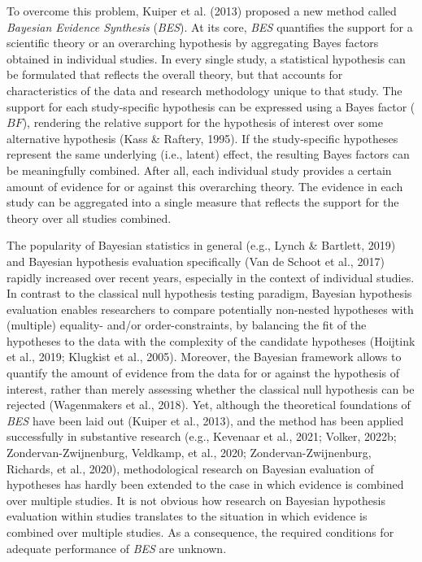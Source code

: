 \documentclass[
]{interact}
\begin{document}
To overcome this problem, Kuiper et al. (2013) proposed a new method
called \emph{Bayesian Evidence Synthesis} (\emph{BES}). At its core,
\emph{BES} quantifies the support for a scientific theory or an
overarching hypothesis by aggregating Bayes factors obtained in
individual studies. In every single study, a statistical hypothesis can
be formulated that reflects the overall theory, but that accounts for
characteristics of the data and research methodology unique to that
study. The support for each study-specific hypothesis can be expressed
using a Bayes factor (\(BF\)), rendering the relative support for the
hypothesis of interest over some alternative hypothesis (Kass \&
Raftery, 1995). If the study-specific hypotheses represent the same
underlying (i.e., latent) effect, the resulting Bayes factors can be
meaningfully combined. After all, each individual study provides a
certain amount of evidence for or against this overarching theory. The
evidence in each study can be aggregated into a single measure that
reflects the support for the theory over all studies combined.

The popularity of Bayesian statistics in general (e.g., Lynch \&
Bartlett, 2019) and Bayesian hypothesis evaluation specifically (Van de
Schoot et al., 2017) rapidly increased over recent years, especially in
the context of individual studies. In contrast to the classical null
hypothesis testing paradigm, Bayesian hypothesis evaluation enables
researchers to compare potentially non-nested hypotheses with (multiple)
equality- and/or order-constraints, by balancing the fit of the
hypotheses to the data with the complexity of the candidate hypotheses
(Hoijtink et al., 2019; Klugkist et al., 2005). Moreover, the Bayesian
framework allows to quantify the amount of evidence from the data for or
against the hypothesis of interest, rather than merely assessing whether
the classical null hypothesis can be rejected (Wagenmakers et al.,
2018). Yet, although the theoretical foundations of \emph{BES} have been
laid out (Kuiper et al., 2013), and the method has been applied
successfully in substantive research (e.g., Kevenaar et al., 2021;
Volker, 2022b; Zondervan-Zwijnenburg, Veldkamp, et al., 2020;
Zondervan-Zwijnenburg, Richards, et al., 2020), methodological research
on Bayesian evaluation of hypotheses has hardly been extended to the
case in which evidence is combined over multiple studies. It is not
obvious how research on Bayesian hypothesis evaluation within studies
translates to the situation in which evidence is combined over multiple
studies. As a consequence, the required conditions for adequate
performance of \emph{BES} are unknown.
\end{document}
